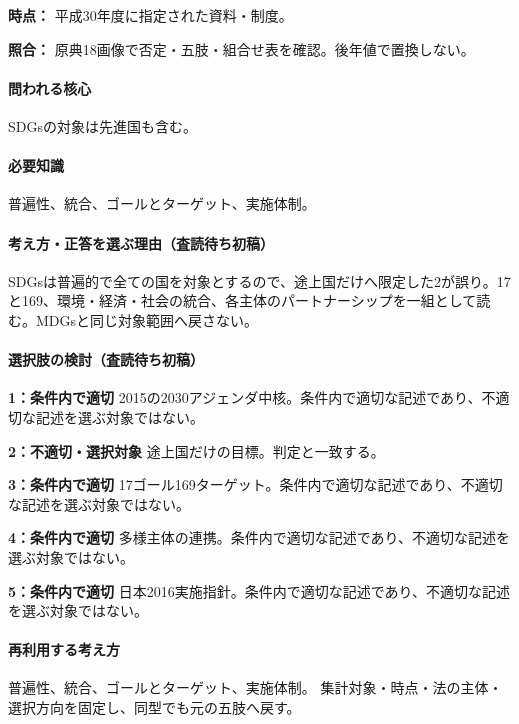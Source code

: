 \noindent\textbf{時点：} 平成30年度に指定された資料・制度。\par

\noindent\textbf{照合：} 原典18画像で否定・五肢・組合せ表を確認。後年値で置換しない。\par

\paragraph{問われる核心} SDGsの対象は先進国も含む。

\paragraph{必要知識} 普遍性、統合、ゴールとターゲット、実施体制。

\paragraph{考え方・正答を選ぶ理由（査読待ち初稿）} SDGsは普遍的で全ての国を対象とするので、途上国だけへ限定した2が誤り。17と169、環境・経済・社会の統合、各主体のパートナーシップを一組として読む。MDGsと同じ対象範囲へ戻さない。

\paragraph{選択肢の検討（査読待ち初稿）}\mbox{}\par

\noindent\textbf{1：条件内で適切} 2015の2030アジェンダ中核。条件内で適切な記述であり、不適切な記述を選ぶ対象ではない。\par

\noindent\textbf{2：不適切・選択対象} 途上国だけの目標。判定と一致する。\par

\noindent\textbf{3：条件内で適切} 17ゴール169ターゲット。条件内で適切な記述であり、不適切な記述を選ぶ対象ではない。\par

\noindent\textbf{4：条件内で適切} 多様主体の連携。条件内で適切な記述であり、不適切な記述を選ぶ対象ではない。\par

\noindent\textbf{5：条件内で適切} 日本2016実施指針。条件内で適切な記述であり、不適切な記述を選ぶ対象ではない。\par

\paragraph{再利用する考え方} 普遍性、統合、ゴールとターゲット、実施体制。 集計対象・時点・法の主体・選択方向を固定し、同型でも元の五肢へ戻す。

